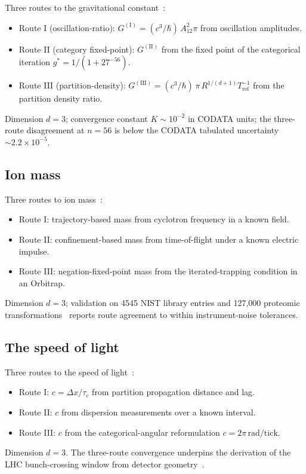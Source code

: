 \documentclass[twocolumn,11pt,a4paper]{article}
\newcommand{\Depth}{n}
\newcommand{\Dim}{d}
\newcommand{\Tolb}{K}
\begin{document}
Three routes to the gravitational constant~\citep{sachikonye2026usd}:
\begin{itemize}[nosep,leftmargin=*]
\item Route I (oscillation-ratio): $G^{(\mathrm{I})} = (c^3/\hbar)\, A_{12}^2 \pi$ from oscillation amplitudes.
\item Route II (category fixed-point): $G^{(\mathrm{II})}$ from the fixed point of the categorical iteration $g^* = 1/(1 + 27^{-56})$.
\item Route III (partition-density): $G^{(\mathrm{III})} = (c^3/\hbar)\,\pi\, R^{1/(\Dim+1)} T_{\mathrm{ref}}^{-1}$ from the partition density ratio.
\end{itemize}
Dimension $\Dim = 3$; convergence constant $\Tolb \sim 10^{-2}$ in CODATA units; the three-route disagreement at $\Depth = 56$ is below the CODATA tabulated uncertainty $\sim 2.2 \times 10^{-5}$.

\subsection{Ion mass}
\label{ssec:spec-mass}

Three routes to ion mass~\citep{sachikonye2026ion}:
\begin{itemize}[nosep,leftmargin=*]
\item Route I: trajectory-based mass from cyclotron frequency in a known field.
\item Route II: confinement-based mass from time-of-flight under a known electric impulse.
\item Route III: negation-fixed-point mass from the iterated-trapping condition in an Orbitrap.
\end{itemize}
Dimension $\Dim = 3$; validation on 4545 NIST library entries and 127{,}000 proteomic transformations~\citep{sachikonye2026ion} reports route agreement to within instrument-noise tolerances.

\subsection{The speed of light}
\label{ssec:spec-c}

Three routes to the speed of light~\citep{sachikonye2026mtm}:
\begin{itemize}[nosep,leftmargin=*]
\item Route I: $c = \Delta x / \tau_c$ from partition propagation distance and lag.
\item Route II: $c$ from dispersion measurements over a known interval.
\item Route III: $c$ from the categorical-angular reformulation $c = 2\pi\,\mathrm{rad/tick}$.
\end{itemize}
Dimension $\Dim = 3$. The three-route convergence underpins the derivation of the LHC bunch-crossing window from detector geometry~\citep{sachikonye2026trajectory}.
\end{document}
